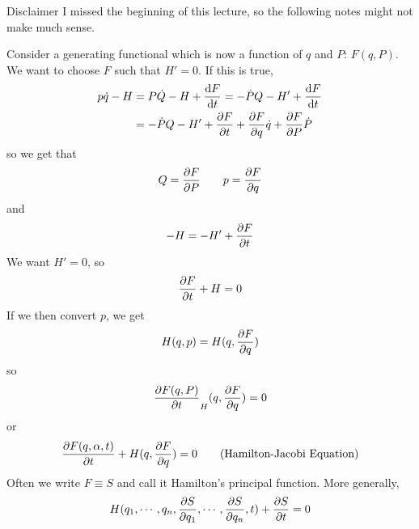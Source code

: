 \documentclass[a4paper,twoside,master.tex]{subfiles}
\begin{document}
\begin{note}{Disclaimer}
    I missed the beginning of this lecture, so the following notes might not make much sense.
\end{note}

Consider a generating functional which is now a function of $ q $ and $ P $: $ F(q,P) $. We want to choose $ F $ such that $ H' = 0 $. If this is true,
\begin{align}
    p\dot{q} - H &= P\dot{Q} - H + \dv{F}{t} = - \dot{P}Q-H' + \dv{F}{t} \\
    &= - \dot{P}Q-H' + \pdv{F}{t} + \pdv{F}{q}\dot{q} + \pdv{F}{P}\dot{P}
\end{align}
so we get that
\begin{equation}
    Q = \pdv{F}{P} \qquad p = \pdv{F}{q}
\end{equation}
and
\begin{equation}
    -H = -H' + \pdv{F}{t}
\end{equation}
We want $ H' = 0 $, so
\begin{equation}
    \pdv{F}{t} + H = 0
\end{equation}
If we then convert $ p $, we get
\begin{equation}
    H(q,p) = H(q, \pdv{F}{q})
\end{equation}
so
\begin{equation}
    \pdv{F(q,P)}{t} _ H(q, \pdv{F}{q}) = 0
\end{equation}
or
\begin{equation}\label{eq:hamilton_jacobi}
    \pdv{F(q, \alpha, t)}{t} + H(q, \pdv{F}{q}) = 0\tag{Hamilton-Jacobi Equation}
\end{equation}
Often we write $ F \equiv S $ and call it Hamilton's principal function. More generally,
\begin{equation}
    H(q_1,\cdots,q_n, \pdv{S}{q_1},\cdots, \pdv{S}{q_n}, t) + \pdv{S}{t} = 0
\end{equation}
\end{document}

